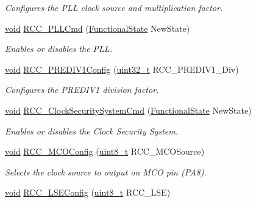 \begin{DoxyCompactItemize}
\begin{DoxyCompactList}\small\item\em Configures the P\-L\-L clock source and multiplication factor. \end{DoxyCompactList}\item 
\hyperlink{group___n_a_m_e_ga18028b8badbf1ea7e704ccac3c488e82}{void} \hyperlink{group___r_c_c___group1_ga84dee53c75e58fdb53571716593c2272}{R\-C\-C\-\_\-\-P\-L\-L\-Cmd} (\hyperlink{group___exported__types_gac9a7e9a35d2513ec15c3b537aaa4fba1}{Functional\-State} New\-State)
\begin{DoxyCompactList}\small\item\em Enables or disables the P\-L\-L. \end{DoxyCompactList}\item 
\hyperlink{group___n_a_m_e_ga18028b8badbf1ea7e704ccac3c488e82}{void} \hyperlink{group___r_c_c___group1_gaafef95d15d42a671f03304f12bda5000}{R\-C\-C\-\_\-\-P\-R\-E\-D\-I\-V1\-Config} (\hyperlink{stdint_8h_a435d1572bf3f880d55459d9805097f62}{uint32\-\_\-t} R\-C\-C\-\_\-\-P\-R\-E\-D\-I\-V1\-\_\-\-Div)
\begin{DoxyCompactList}\small\item\em Configures the P\-R\-E\-D\-I\-V1 division factor. \end{DoxyCompactList}\item 
\hyperlink{group___n_a_m_e_ga18028b8badbf1ea7e704ccac3c488e82}{void} \hyperlink{group___r_c_c___group1_ga0ff1fd7b9a8a49cdda11b7d7261c3494}{R\-C\-C\-\_\-\-Clock\-Security\-System\-Cmd} (\hyperlink{group___exported__types_gac9a7e9a35d2513ec15c3b537aaa4fba1}{Functional\-State} New\-State)
\begin{DoxyCompactList}\small\item\em Enables or disables the Clock Security System. \end{DoxyCompactList}\item 
\hyperlink{group___n_a_m_e_ga18028b8badbf1ea7e704ccac3c488e82}{void} \hyperlink{group___r_c_c___group1_ga683f340ed905f390bde0d38cb1e734cd}{R\-C\-C\-\_\-\-M\-C\-O\-Config} (\hyperlink{stdint_8h_aba7bc1797add20fe3efdf37ced1182c5}{uint8\-\_\-t} R\-C\-C\-\_\-\-M\-C\-O\-Source)
\begin{DoxyCompactList}\small\item\em Selects the clock source to output on M\-C\-O pin (P\-A8). \end{DoxyCompactList}\item 
\hyperlink{group___n_a_m_e_ga18028b8badbf1ea7e704ccac3c488e82}{void} \hyperlink{group___r_c_c___group1_ga65209ab5c3589b249c7d70f978735ca6}{R\-C\-C\-\_\-\-L\-S\-E\-Config} (\hyperlink{stdint_8h_aba7bc1797add20fe3efdf37ced1182c5}{uint8\-\_\-t} R\-C\-C\-\_\-\-L\-S\-E)

\end{DoxyCompactItemize}
